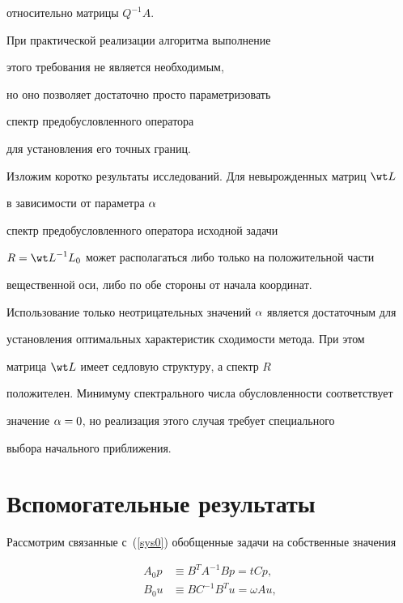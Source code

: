 относительно матрицы $Q^{-1}A$.


\medskip





При практической реализации алгоритма выполнение 


этого требования не является необходимым,


но оно позволяет достаточно просто параметризовать 


спектр предобусловленного оператора


для установления его точных границ.





Изложим коротко результаты исследований. Для невырожденных матриц $\wt L$


в зависимости от параметра $\alpha$ 


спектр предобусловленного оператора исходной задачи


$R={\wt L}^{-1}L_0$ может располагаться либо только на положительной части


вещественной оси, либо по обе стороны от начала координат.


Использование только неотрицательных значений $\alpha$ является достаточным для


установления оптимальных характеристик сходимости метода. При этом


матрица $\wt L$ имеет седловую структуру, а спектр $R$


положителен. Минимуму спектрального числа обусловленности соответствует


значение $\alpha =0$, но реализация этого случая требует специального


выбора начального приближения.





\section{Вспомогательные результаты}





Рассмотрим связанные с~(\ref{sys0}) обобщенные задачи на собственные значения


\begin{align}


\label{zad1}


A_0 p & \equiv B^T A^{-1} B p = t C p, \\


%


\label{zad2}


B_{0} u & \equiv B C^{-1} B^T u = \omega A u ,


\end{align}


